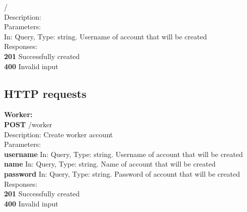\documentclass[11pt,a4paper,pdftex]{article}
\begin{document}
\hspace*{1em}\textbf{ } /\\
\hspace*{2em}Description: \\
\hspace*{2em}Parameters:\\
\hspace*{3em}\textbf{ } In: Query, Type: string. Username of account that will be created\\
\hspace*{2em}Responses:\\
\hspace*{3em}\textbf{201} Successfully created\\
\hspace*{3em}\textbf{400} Invalid input

\subsection{HTTP requests}
\textbf{Worker:}\\
\hspace*{1em}\textbf{POST} /worker\\
\hspace*{2em}Description: Create worker account\\
\hspace*{2em}Parameters:\\
\hspace*{3em}\textbf{username} In: Query, Type: string. Username of account that will be created\\
\hspace*{3em}\textbf{name} In: Query, Type: string. Name of account that will be created\\
\hspace*{3em}\textbf{password} In: Query, Type: string. Password of account that will be created\\
\hspace*{2em}Responses:\\
\hspace*{3em}\textbf{201} Successfully created\\
\hspace*{3em}\textbf{400} Invalid input
\end{document}

